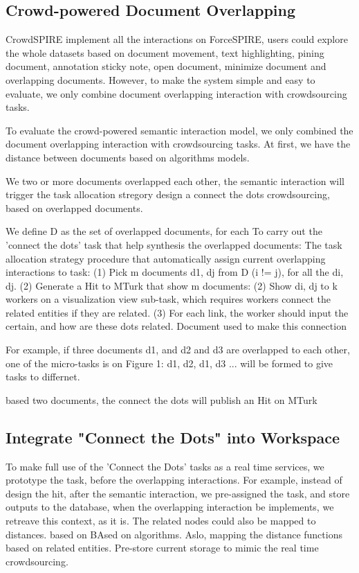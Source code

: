 \documentclass[journal]{vgtc}                %
\begin{document}
\subsection{Crowd-powered Document Overlapping}
CrowdSPIRE implement all the interactions on ForceSPIRE, users could explore the whole datasets based on document movement, text highlighting, pining document, annotation sticky note, open document, minimize document and overlapping documents. However, to make the system simple and easy to evaluate, we only combine document overlapping interaction with crowdsourcing tasks.

To evaluate the crowd-powered semantic interaction model, we only combined the document overlapping interaction with crowdsourcing tasks.
At first, we have the distance between documents based on algorithms models.

We two or more documents overlapped each other, the semantic interaction will trigger the task allocation stregory design a connect the dots crowdsourcing, based on overlapped documents.

We define D as the set of overlapped documents, for each
To carry out the 'connect the dots' task that help synthesis the overlapped documents:
The task allocation strategy procedure that automatically assign current overlapping interactions to task:\newline
(1) Pick m documents d1, dj from D (i != j), for all the di, dj. \newline
(2) Generate a Hit to MTurk that show m documents:
(2)	Show di, dj to k workers on a visualization view sub-task, which requires workers connect the related entities if they are related. \newline
(3) For each link, the worker should input the certain, and how are these dots related. Document used to make this connection \newline

For example, if three documents d1, and d2 and d3 are overlapped to each other, one of the micro-tasks is on Figure 1: {d1, d2}, {d1, d3} ... will be formed to give tasks to differnet.

based two documents, the connect the dots will publish an Hit on MTurk

\subsection{Integrate "Connect the Dots" into Workspace}
To make full use of the 'Connect the Dots' tasks as a real time services, we prototype the task, before the overlapping interactions.
For example, instead of design the hit, after the semantic interaction, we pre-assigned the task, and store outputs to the database, when the overlapping interaction be implements, we retreave this context, as it is.
The related nodes could also be mapped to distances. based on
BAsed on algorithms. Aslo, mapping the distance functions based on related entities.
Pre-store current storage to mimic the real time crowdsourcing.
\end{document}
